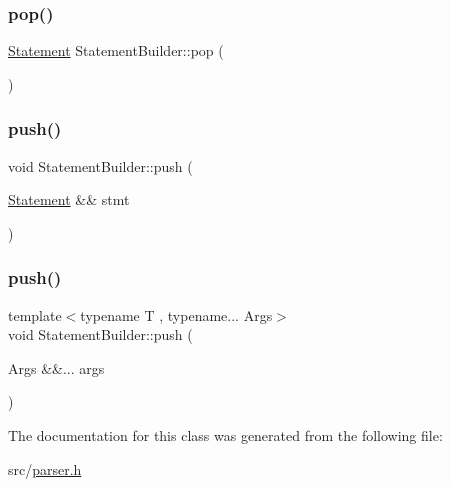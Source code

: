 \subsubsection{\texorpdfstring{pop()}{pop()}}
{\footnotesize\ttfamily \hyperlink{ast_8h_a8b6ddf3732a0acd77e6b2509fb21a5fd}{Statement} Statement\+Builder\+::pop (\begin{DoxyParamCaption}{ }\end{DoxyParamCaption})\hspace{0.3cm}{\ttfamily [inline]}}

\mbox{\label{class_statement_builder_abeed5dfee736817de06d468b5ae9da42}} 
\subsubsection{\texorpdfstring{push()}{push()}\hspace{0.1cm}{\footnotesize\ttfamily [1/2]}}
{\footnotesize\ttfamily void Statement\+Builder\+::push (\begin{DoxyParamCaption}\item[{\hyperlink{ast_8h_a8b6ddf3732a0acd77e6b2509fb21a5fd}{Statement} \&\&}]{stmt }\end{DoxyParamCaption})\hspace{0.3cm}{\ttfamily [inline]}}

\mbox{\label{class_statement_builder_a54afe55d6ae2e0b12a4673b285bf758d}} 
\subsubsection{\texorpdfstring{push()}{push()}\hspace{0.1cm}{\footnotesize\ttfamily [2/2]}}
{\footnotesize\ttfamily template$<$typename T , typename... Args$>$ \\
void Statement\+Builder\+::push (\begin{DoxyParamCaption}\item[{Args \&\&...}]{args }\end{DoxyParamCaption})\hspace{0.3cm}{\ttfamily [inline]}}



The documentation for this class was generated from the following file\+:\begin{DoxyCompactItemize}
\item 
src/\hyperlink{parser_8h}{parser.\+h}\end{DoxyCompactItemize}
